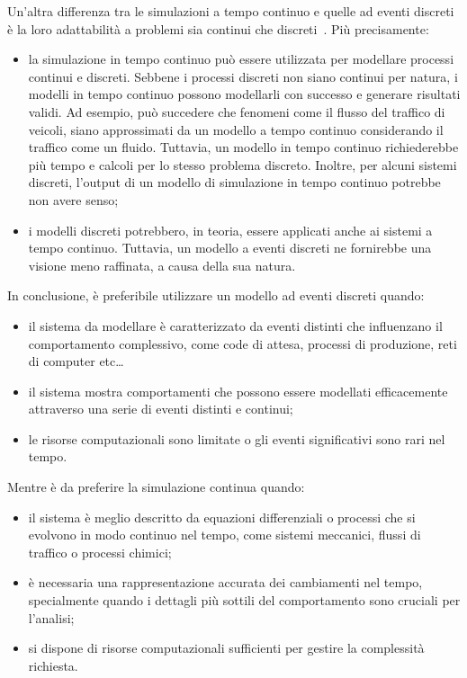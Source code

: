 \documentclass[12pt,a4paper,openright,twoside]{book}
\begin{document}
Un'altra differenza tra le simulazioni a tempo continuo e quelle ad eventi discreti è la loro adattabilità a problemi sia continui che discreti~\cite{zgn2009DiscreteVC}. Più precisamente:
\begin{itemize}
    \item la simulazione in tempo continuo può essere utilizzata per modellare processi continui e discreti. Sebbene i processi discreti non siano continui per natura, i modelli in tempo continuo possono modellarli con successo e generare risultati validi. Ad esempio, può succedere che fenomeni come il flusso del traffico di veicoli, siano approssimati da un modello a tempo continuo considerando il traffico come un fluido. Tuttavia, un modello in tempo continuo richiederebbe più tempo e calcoli per lo stesso problema discreto. Inoltre, per alcuni sistemi discreti, l'output di un modello di simulazione in tempo continuo potrebbe non avere senso;
    \item i modelli discreti potrebbero, in teoria, essere applicati anche ai sistemi a tempo continuo. Tuttavia, un modello a eventi discreti ne fornirebbe una visione meno raffinata, a causa della sua natura.
\end{itemize}

In conclusione, è preferibile utilizzare un modello ad eventi discreti quando: 
\begin{itemize}
    \item il sistema da modellare è caratterizzato da eventi distinti che influenzano il comportamento complessivo, come code di attesa, processi di produzione, reti di computer etc\dots
    \item il sistema mostra comportamenti che possono essere modellati efficacemente attraverso una serie di eventi distinti e continui; 
    \item le risorse computazionali sono limitate o gli eventi significativi sono rari nel tempo.
\end{itemize}
Mentre è da preferire la simulazione continua quando: 
\begin{itemize}
    \item il sistema è meglio descritto da equazioni differenziali o processi che si evolvono in modo continuo nel tempo, come sistemi meccanici, flussi di traffico o processi chimici; 
    \item è necessaria una rappresentazione accurata dei cambiamenti nel tempo, specialmente quando i dettagli più sottili del comportamento sono cruciali per l'analisi; 
    \item si dispone di risorse computazionali sufficienti per gestire la complessità richiesta.
\end{itemize}
\end{document}
